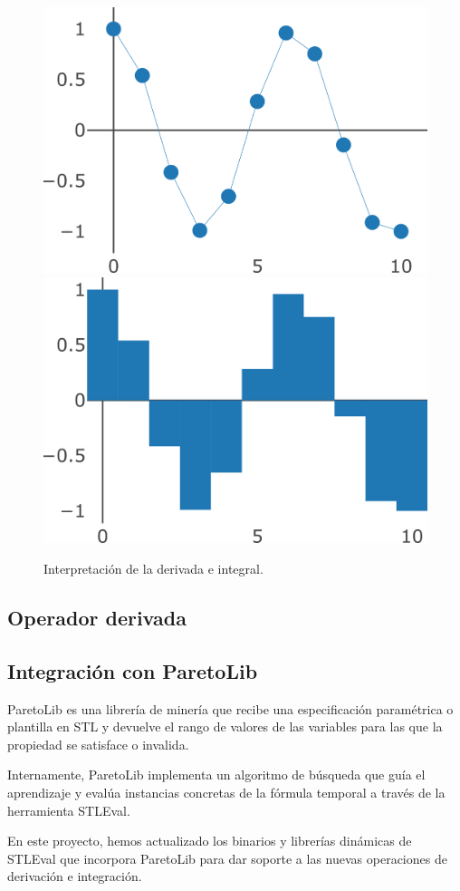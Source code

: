 \begin{figure}
\centering
  \includegraphics[width=.4\linewidth]{images/derivada} \hfill
  \includegraphics[width=.4\linewidth]{images/integral}
\caption{Interpretación de la derivada e integral.}
\label{fig:der_int}
\end{figure}


\subsection{Operador derivada}

\subsection{Integración con ParetoLib}
ParetoLib \cite{FORMATS_19, ParetoLib} es una librería de minería que recibe una especificación paramétrica o plantilla en STL y devuelve el rango de valores de las variables para las que la propiedad se satisface o invalida. 

Internamente, ParetoLib implementa un algoritmo de búsqueda que guía el aprendizaje y evalúa instancias concretas de la fórmula temporal a través de la herramienta STLEval.

En este proyecto, hemos actualizado los binarios y librerías dinámicas de STLEval que incorpora ParetoLib para dar soporte a las nuevas operaciones de derivación e integración. 

